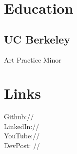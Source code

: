 \documentclass[]{deedy-resume-openfont}
\begin{document}
%
%
\lastupdated

%
%



%
%

\begin{minipage}[t]{0.33\textwidth} 


\section{Education} 

\subsection{UC Berkeley}
Art Practice Minor \\
\sectionsep


\section{Links} 
Github:// \href{https://github.com/lulu-wang}{} \\
LinkedIn://  \href{https://www.linkedin.com/in/luluwang25}{} \\
YouTube://  \href{https://www.youtube.com/channel/UCdYrIU1HwvnvfsKthP5k95Q}{} \\
DevPost: // \href {https://devpost.com/lulu-wang?ref_content=user-portfolio&ref_feature=portfolio&ref_medium=global-nav}{}\\ 
\sectionsep



\end{minipage}
\end{document}
